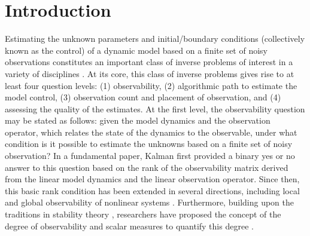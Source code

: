 \documentclass{article}
\begin{document}
\section{Introduction} \label{sec:intro}
Estimating the unknown parameters and initial/boundary conditions (collectively known as the control) of a dynamic model based on a finite set of noisy observations constitutes an important class of inverse problems of interest in a variety of disciplines \cite{tarantola1987inverse,kalnay2003atmospheric,kaipio2006statistical,lewis2006dynamic,biros2011large,edwards2015regional,asch2016data,vieli2006numerical,houtekamer2016review,bannister2017review,carrassi2018data,geer2021learning,brajard2021combining}. At its core, this class of inverse problems gives \textcolor{rev}{rise} to at least four question levels: (1) observability, (2) algorithmic path to estimate the model control, (3) observation count and placement of observation, and (4) assessing the quality of the estimates. At the first level, the observability question may be stated as follows: given the model dynamics and the observation operator, which relates the state of the dynamics to the observable, under what condition is it possible to estimate the unknowns based on a finite set of noisy observation? In a fundamental paper, Kalman \cite{kalman1960general} first provided a binary yes or no answer to this question based on the rank of the observability matrix derived from the linear model dynamics and the linear observation operator. Since then, this basic rank condition has been extended in several directions, including local and global observability of nonlinear systems \cite{casti1985nonlinear,isidori1985nonlinear}. 
Furthermore, building upon the traditions in stability theory \cite{bellman1953stability}, researchers have proposed the concept of the degree of observability and scalar measures to quantify this degree \cite{brown1966not,kang2009quantitative,kang2012optimal,king2015observability}. 
\end{document}
